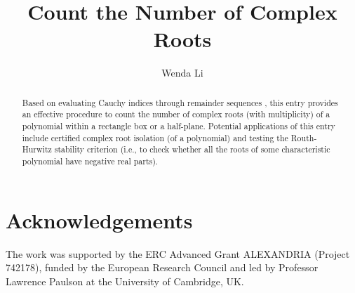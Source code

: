 \documentclass[11pt,a4paper]{article}
\begin{document}
\title{Count the Number of Complex Roots}
\author{Wenda Li}
\maketitle

\begin{abstract}
  Based on evaluating Cauchy indices through remainder sequences \cite{eisermann2012fundamental} \cite[Chapter 11]{rahman2002analytic}, this entry provides an effective procedure to count the number of complex roots (with multiplicity) of a polynomial within a rectangle box or a half-plane. Potential applications of this entry include certified complex root isolation (of a polynomial) and testing the Routh-Hurwitz stability criterion (i.e., to check whether all the roots of some characteristic polynomial have negative real parts).
\end{abstract}




\section{Acknowledgements}
The work was supported by the ERC Advanced Grant ALEXANDRIA (Project 742178), funded by the European Research Council
and led by Professor Lawrence Paulson at the University of Cambridge, UK.



\end{document}
